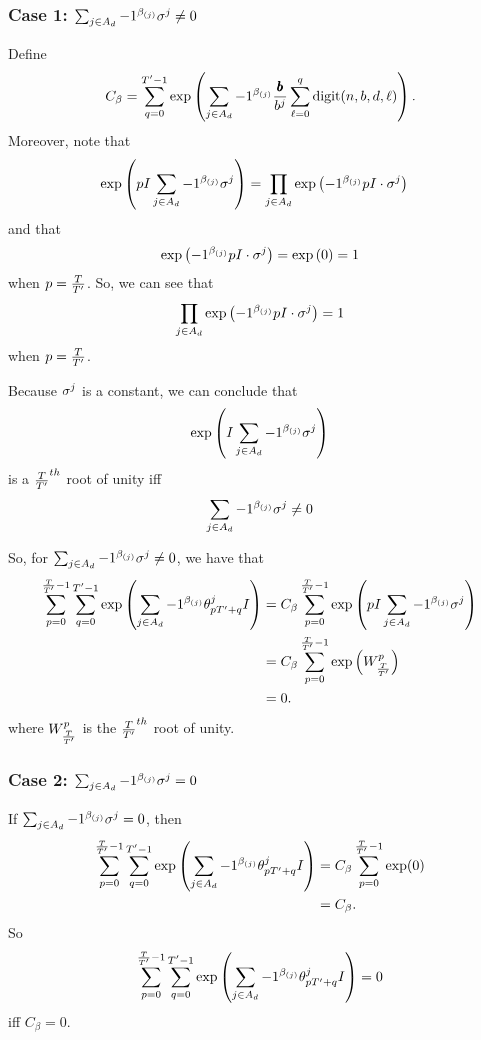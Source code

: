 \subsubsection*{Case 1: $\sum_{j \in A_d} -1 ^ {\beta_{(j)}} \sigma^j \neq 0$}
Define
$$
  C_\beta = \sum_{q = 0}^{{T}' - 1}
  \exp\left(
      \sum_{j \in A_d} -1 ^ {\beta_{(j)}} \frac{{\pmb{b}}}{b^j}
        \sum_{\ell = 0}^{q}\mathrm{digit}(n, b, d, \ell)
  \right).
$$
Moreover, note that 
\begin{align*}
  &\exp\left(
      pI \sum_{j \in A_d} -1 ^ {\beta_{(j)}}
      \sigma^j
    \right)
  = \prod_{j \in A_d} \exp\left(-1^{\beta_{(j)}} pI \cdot \sigma^j \right)
\end{align*}
and that 
\begin{equation*}
  \exp\left(-1^{\beta_{(j)}} pI \cdot \sigma^j \right) = \exp\left(0\right) = 1
\end{equation*}
when $p = \frac{T}{{T}'}$. So, we can see that
$$
\prod_{j \in A_d} \exp\left(-1^{\beta_{(j)}} pI \cdot \sigma^j \right) = 1
$$
when $p = \frac{T}{{T}'}$.

Because $\sigma^j$ is a constant, we can conclude that
\begin{equation*}
 \exp\left(
      I \sum_{j \in A_d} -1 ^ {\beta_{(j)}}
      \sigma^j
    \right) 
\end{equation*}
is a $\frac{T}{{T}'}^{th}$ root of unity iff 
$$\sum_{j \in A_d} -1 ^ {\beta_{(j)}}\sigma^j \neq 0$$

So, for $\sum_{j \in A_d} -1 ^ {\beta_{(j)}}\sigma^j \neq 0$, we have that
\begin{align*}
  \sum_{p= 0}^{\frac{T}{{T}'} - 1} \sum_{q = 0}^{{T}' - 1} \exp\left( \sum_{j \in A_d} -1 ^ {\beta_{(j)}} {\theta^j_{p {T}' + q}}I \right) &= C_\beta \sum_{p= 0}^{\frac{T}{{T}'} - 1}
    \exp\left(
      pI \sum_{j \in A_d} -1 ^ {\beta_{(j)}}
      \sigma^j
    \right) \\
    &= C_\beta \sum_{p = 0}^{\frac{T}{{T}'} - 1}\exp\left(W_{\frac{T}{{T}'}}^p\right) \\
    &= 0.
\end{align*}
where $W_{\frac{T}{{T}'}}^p$ is the $\frac{T}{{T}'}^{th}$ root of unity.

\subsubsection*{Case 2: $\sum_{j \in A_d} -1 ^ {\beta_{(j)}} \sigma^j = 0$}
If $\sum_{j \in A_d} -1 ^ {\beta_{(j)}} \sigma^j = 0$, then 
\begin{align*}
  \sum_{p= 0}^{\frac{T}{{T}'} - 1} \sum_{q = 0}^{{T}' - 1} \exp\left( \sum_{j \in A_d} -1 ^ {\beta_{(j)}} {\theta^j_{p {T}' + q}}I \right) &= C_\beta \sum_{p= 0}^{\frac{T}{{T}'} - 1} \exp(0) \\
  &= C_\beta.
\end{align*}
So $$\sum_{p= 0}^{\frac{T}{{T}'} - 1} \sum_{q = 0}^{{T}' - 1} \exp\left( \sum_{j \in A_d} -1 ^ {\beta_{(j)}} {\theta^j_{p {T}' + q}}I \right) = 0$$ iff $C_\beta = 0$.


